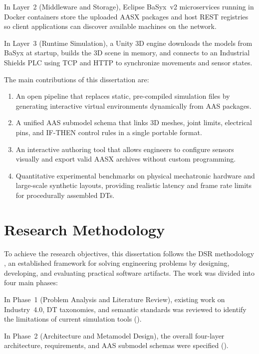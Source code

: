 In Layer~2 (Middleware and Storage), Eclipse BaSyx~v2 microservices running in Docker containers store the uploaded \gls{AASX} packages and host \gls{REST} registries so client applications can discover available machines on the network.

In Layer~3 (Runtime Simulation), a Unity 3D engine downloads the models from BaSyx at startup, builds the 3D scene in memory, and connects to an Industrial Shields \gls{PLC} using \gls{TCP} and \gls{HTTP} to synchronize movements and sensor states.

The main contributions of this dissertation are:
\begin{enumerate}
    \item An open pipeline that replaces static, pre-compiled simulation files by generating interactive virtual environments dynamically from \gls{AAS} packages.
    \item A unified \gls{AAS} submodel schema that links 3D meshes, joint limits, electrical pins, and IF-THEN control rules in a single portable format.
    \item An interactive authoring tool that allows engineers to configure sensors visually and export valid \gls{AASX} archives without custom programming.
    \item Quantitative experimental benchmarks on physical mechatronic hardware and large-scale synthetic layouts, providing realistic latency and frame rate limits for procedurally assembled \glspl{DT}.
\end{enumerate}

\section{Research Methodology}

To achieve the research objectives, this dissertation follows the \gls{DSR} methodology \cite{Peffers2007}, an established framework for solving engineering problems by designing, developing, and evaluating practical software artifacts. The work was divided into four main phases:

In Phase~1 (Problem Analysis and Literature Review), existing work on Industry~4.0, \gls{DT} taxonomies, and semantic standards was reviewed to identify the limitations of current simulation tools ().

In Phase~2 (Architecture and Metamodel Design), the overall four-layer architecture, requirements, and \gls{AAS} submodel schemas were specified ().

